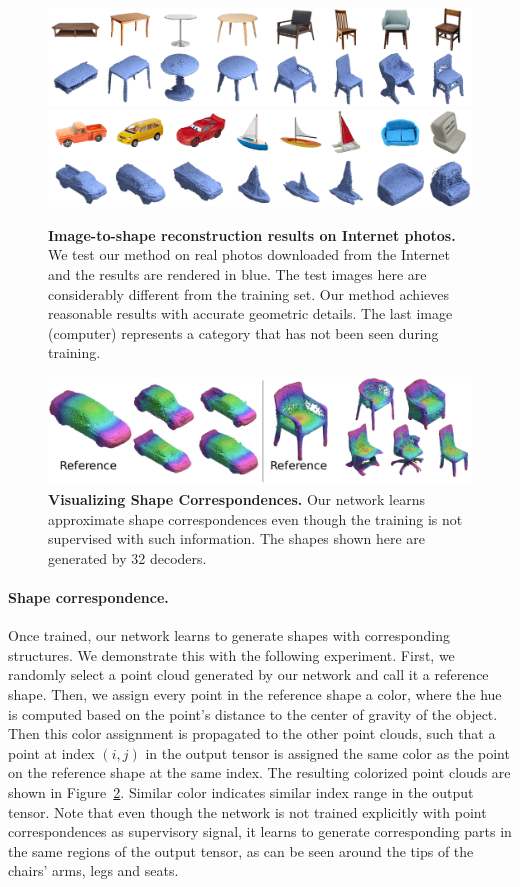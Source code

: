 \begin{figure}[t]
\centering
\includegraphics[width=0.9\linewidth]{imgs/furniture.pdf}
\includegraphics[width=0.9\linewidth]{imgs/toys.pdf}
	\caption{\label{fig:toy} \small
	\textbf{Image-to-shape reconstruction results on Internet photos.} We test our method on real photos downloaded from the Internet and the results are rendered in blue. 
    The test images here are considerably different from the training set. Our method achieves reasonable results with accurate geometric details. The last image (computer) represents a category that has not been seen during training.
    }
\end{figure}

\begin{figure}[h!]
\centering
\includegraphics[width=0.8\linewidth]{imgs/corresp.pdf}
	\caption{\label{fig:corresp} \small
	\textbf{Visualizing Shape Correspondences.}
	Our network learns approximate shape correspondences even though the training is not supervised with such information. The shapes shown here are generated by 32 decoders.
	}
\end{figure}

\paragraph{Shape correspondence.} Once trained, our network learns to generate shapes with corresponding structures.
We demonstrate this with the following experiment.
First, we randomly select a point cloud generated by our network and call it a reference shape.
Then, we assign every point in the reference shape a color, where the hue is computed based on the point's distance to the center of gravity of the object.
Then this color assignment is propagated to the other point clouds, such that a point at index $(i,j)$ in the output tensor is assigned the same color as the point on the reference shape at the same index.
The resulting colorized point clouds are shown in Figure~\ref{fig:corresp}. Similar color indicates similar index range in the output tensor.
Note that even though the network is not trained explicitly with point correspondences as
supervisory signal, it learns to generate corresponding parts in the same
regions of the output tensor, as can be seen around
the tips of the chairs' arms,  legs and  seats.


